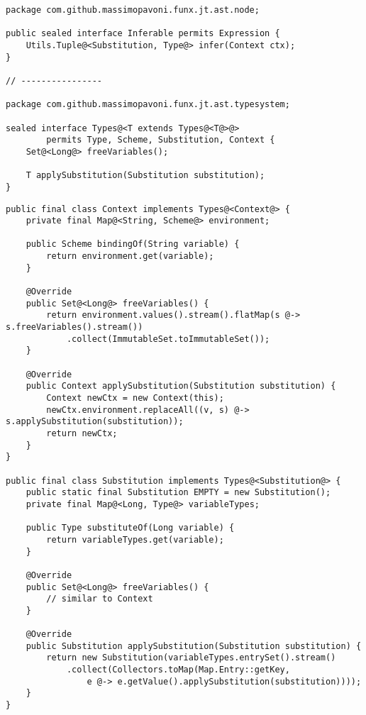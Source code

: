 \begin{lstlisting}[caption={Interfacce utili nel \textit{sistema HM}}, style=javaCode, label={lst:5-8-hm-interfaces-java}]
package com.github.massimopavoni.funx.jt.ast.node;

public sealed interface Inferable permits Expression {
    Utils.Tuple@<Substitution, Type@> infer(Context ctx);
}

// ----------------

package com.github.massimopavoni.funx.jt.ast.typesystem;

sealed interface Types@<T extends Types@<T@>@>
        permits Type, Scheme, Substitution, Context {
    Set@<Long@> freeVariables();

    T applySubstitution(Substitution substitution);
}
\end{lstlisting}
\vspace{4mm}
\begin{lstlisting}[caption={Altre classi del \textit{sistema HM}}, style=javaCode, label={lst:5-8-hm-more-classes-java}]
public final class Context implements Types@<Context@> {
    private final Map@<String, Scheme@> environment;

    public Scheme bindingOf(String variable) {
        return environment.get(variable);
    }

    @Override
    public Set@<Long@> freeVariables() {
        return environment.values().stream().flatMap(s @-> s.freeVariables().stream())
            .collect(ImmutableSet.toImmutableSet());
    }

    @Override
    public Context applySubstitution(Substitution substitution) {
        Context newCtx = new Context(this);
        newCtx.environment.replaceAll((v, s) @-> s.applySubstitution(substitution));
        return newCtx;
    }
}

public final class Substitution implements Types@<Substitution@> {
    public static final Substitution EMPTY = new Substitution();
    private final Map@<Long, Type@> variableTypes;

    public Type substituteOf(Long variable) {
        return variableTypes.get(variable);
    }

    @Override
    public Set@<Long@> freeVariables() {
        // similar to Context
    }

    @Override
    public Substitution applySubstitution(Substitution substitution) {
        return new Substitution(variableTypes.entrySet().stream()
            .collect(Collectors.toMap(Map.Entry::getKey,
                e @-> e.getValue().applySubstitution(substitution))));
    }
}
\end{lstlisting}